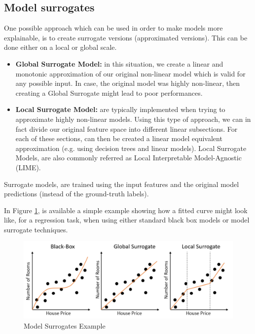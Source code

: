 \subsection{Model surrogates}

One possible approach which can be used in order to make models more explainable, is to create surrogate versions (approximated versions). This can be done either on a local or global scale.

\begin{itemize}
    \item \textbf{Global Surrogate Model:} in this situation, we create a linear and monotonic approximation of our original non-linear model which is valid for any possible input. In case, the original model was highly non-linear, then creating a Global Surrogate might lead to poor performances.
    \item \textbf{Local Surrogate Model:} are typically implemented when trying to approximate highly non-linear models. Using this type of approach, we can in fact divide our original feature space into different linear subsections. For each of these sections, can then be created a linear model equivalent approximation (e.g. using decision trees and linear models). Local Surrogate Models, are also commonly referred as Local Interpretable Model-Agnostic (LIME).
\end{itemize}

Surrogate models, are trained using the input features and the original model predictions (instead of the ground-truth labels).

In Figure \ref{ex_xai}, is available a simple example showing how a fitted curve might look like, for a regression task, when using either standard black box models or model surrogate techniques. 

\begin{figure}[ht!]%
    \centering
    \includegraphics[width=0.75\linewidth]{latex/images/xai_d.pdf}
    \vspace{-0.2cm}
    \caption{Model Surrogates Example}
    \label{ex_xai}
\end{figure}
\vspace{-0.5cm}

